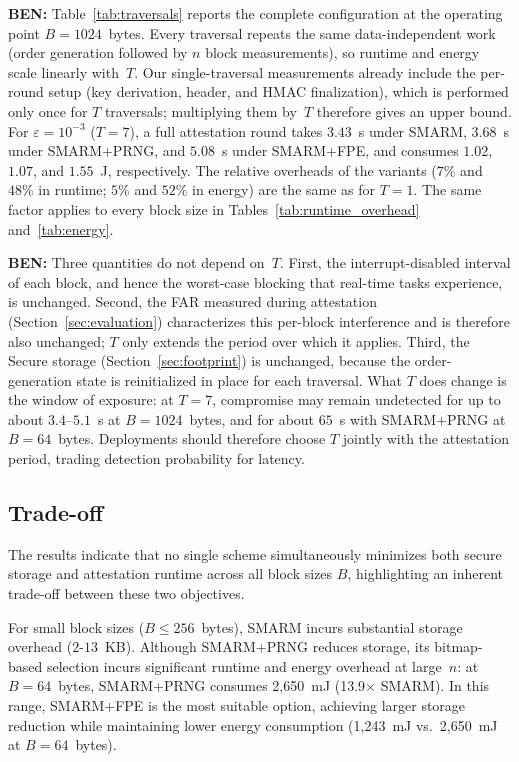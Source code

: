\documentclass{ieeeaccess}
\DeclareRobustCommand{\ben}[1]{{\color{BENcolor}\textbf{BEN:} #1}}
\newcommand{\rtsmarmone}{SMARM+PRNG\xspace}
\newcommand{\rtsmarmtwo}{SMARM+FPE\xspace}
\begin{document}
\ben{Table~\ref{tab:traversals} reports the complete configuration at the operating point $B = 1024$~bytes.
Every traversal repeats the same data-independent work (order generation followed by $n$ block measurements), so runtime and energy scale linearly with~$T$.
Our single-traversal measurements already include the per-round setup (key derivation, header, and HMAC finalization), which is performed only once for $T$ traversals; multiplying them by~$T$ therefore gives an upper bound.
For $\varepsilon = 10^{-3}$ ($T = 7$), a full attestation round takes $3.43$~s under SMARM, $3.68$~s under \rtsmarmone, and $5.08$~s under \rtsmarmtwo, and consumes $1.02$, $1.07$, and $1.55$~J, respectively.
The relative overheads of the variants ($7\%$ and $48\%$ in runtime; $5\%$ and $52\%$ in energy) are the same as for $T = 1$.
The same factor applies to every block size in Tables~\ref{tab:runtime_overhead} and~\ref{tab:energy}.}

\ben{Three quantities do not depend on~$T$.
First, the interrupt-disabled interval of each block, and hence the worst-case blocking that real-time tasks experience, is unchanged.
Second, the FAR measured during attestation (Section~\ref{sec:evaluation}) characterizes this per-block interference and is therefore also unchanged; $T$ only extends the period over which it applies.
Third, the Secure storage (Section~\ref{sec:footprint}) is unchanged, because the order-generation state is reinitialized in place for each traversal.
What $T$ does change is the window of exposure: at $T = 7$, compromise may remain undetected for up to about $3.4$--$5.1$~s at $B = 1024$~bytes, and for about $65$~s with \rtsmarmone at $B = 64$~bytes.
Deployments should therefore choose $T$ jointly with the attestation period, trading detection probability for latency.}

\subsection{Trade-off}
The results indicate that no single scheme simultaneously minimizes both secure storage and attestation runtime across all block sizes $B$, highlighting an inherent trade-off between these two objectives.

For small block sizes ($B \leq 256$~bytes), SMARM incurs 
substantial storage overhead ($2$-$13$~KB). Although 
\rtsmarmone reduces storage, its bitmap-based selection 
incurs significant runtime and energy overhead at large~$n$: 
at $B = 64$~bytes, \rtsmarmone consumes 2{,}650~mJ 
(13.9$\times$ SMARM). In this range, \rtsmarmtwo is the 
most suitable option, achieving larger storage reduction 
while maintaining lower energy consumption (1{,}243~mJ 
vs.\ 2{,}650~mJ at $B = 64$~bytes).
\end{document}
